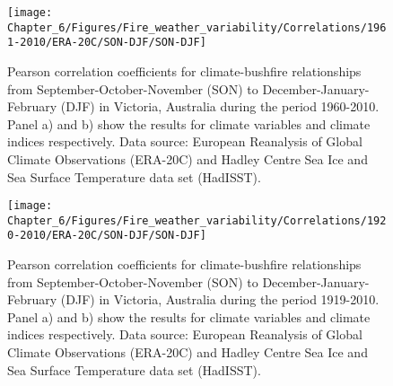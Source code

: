 \begin{figure}[h]
\noindent \begin{centering}
\texttt{[image: Chapter\_6/Figures/Fire\_weather\_variability/Correlations/1961-2010/ERA-20C/SON-DJF/SON-DJF]}
\par\end{centering}

\caption[Pearson correlation coefficients for climate-bushfire relationships
from September-October-November (SON) to December-January-February
(DJF) in Victoria, Australia during the period 1960-2010]{Pearson correlation coefficients for climate-bushfire relationships
from September-October-November (SON) to December-January-February
(DJF) in Victoria, Australia during the period 1960-2010. Panel a)
and b) show the results for climate variables and climate indices
respectively. Data source: European Reanalysis of Global Climate Observations
(ERA-20C) and Hadley Centre Sea Ice and Sea Surface Temperature data
set (HadISST). \label{fig:Pearson correlation coeficients for climate-bushfire relationships from September-October-November to December-January-February in Victoria, Australia during the period 1960-2010}}
\end{figure}


\begin{figure}[h]
\noindent \begin{centering}
\texttt{[image: Chapter\_6/Figures/Fire\_weather\_variability/Correlations/1920-2010/ERA-20C/SON-DJF/SON-DJF]}
\par\end{centering}

\caption[Pearson correlation coefficients for climate-bushfire relationships
from September-October-November (SON) to December-January-February
(DJF) in Victoria, Australia during the period 1919-2010]{Pearson correlation coefficients for climate-bushfire relationships
from September-October-November (SON) to December-January-February
(DJF) in Victoria, Australia during the period 1919-2010. Panel a)
and b) show the results for climate variables and climate indices
respectively. Data source: European Reanalysis of Global Climate Observations
(ERA-20C) and Hadley Centre Sea Ice and Sea Surface Temperature data
set (HadISST). \label{fig:Pearson correlation coefficients for climate-bushfire relationships from September-October-November to December-January-February in Victoria, Australia during the period 1919-2010 (r)}}
\end{figure}



